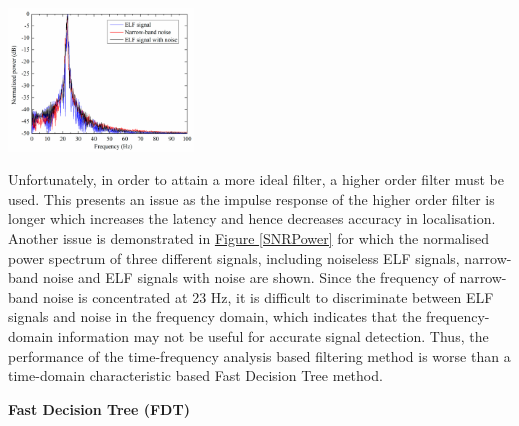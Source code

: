 \documentclass[11pt]{article}		%
\newcommand{\figref}[1]{\hyperref[#1]{Figure \ref*{#1}}}    %
\begin{document}
			\begin{floatingfigure}[r]{0.4\textwidth}
				\centering
				\includegraphics[width=0.37\textwidth]{SNRPower}
				\caption{Normalised power spectrum when SNR is 0 dB and speed is 15 m/s}
				\label{SNRPower}
			\end{floatingfigure}
            \hspace*{3ex}Unfortunately, in order to attain a more ideal filter, a higher order filter must be used.
			This presents an issue as the impulse response of the higher order filter is longer which increases the latency and hence decreases accuracy in localisation. 
			Another issue is demonstrated in \figref{SNRPower} for which the normalised power spectrum of three different signals, including noiseless ELF signals, narrow-band noise and ELF signals with noise are shown. 
			Since the frequency of narrow-band noise is concentrated at 23 Hz, it is difficult to discriminate between ELF signals and noise in the frequency domain, which indicates that the frequency-domain information may not be useful for accurate signal detection. 
			Thus, the performance of the time-frequency analysis based filtering method is worse than a time-domain characteristic based Fast Decision Tree method.
	
		    \textbf{Fast Decision Tree (FDT)}
		    
\end{document}
